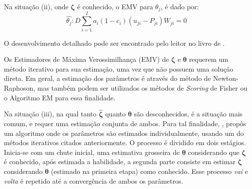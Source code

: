 Na situação (ii), onde $\boldsymbol{\zeta}$ é conhecido, o EMV para $ \theta_j $,  é dado por:\\


\[ \hat{\theta_j} : D\sum_{i=1}^{I}{a_i(1-c_i)(u_{ji}-P_{ji})W_{ji}} = 0  \] 

O desenvolvimento detalhado pode ser encontrado pelo leitor no livro de .

Os Estimadores de Máxima Verossimilhança (EMV) de $ \boldsymbol{\zeta} $ e $ \boldsymbol{\theta} $ requerem um método iterativo para sua estimação, uma vez que não possuem uma solução direta. Em geral, a estimação dos parâmetros é através do método de Newton-Raphoson, mas também podem ser utilizados os métodos de \textit{Scoring} de Fisher ou o Algoritmo EM para essa finalidade.

\begin{comment}
 \citeonline{de2000teoria}. Sendo assim, considerando $\boldsymbol{\hat{\zeta}}^{(t)}_{i}$
uma estimativa de $\boldsymbol{\hat{\zeta}}$ na iteração $t$, o procedimento de
Newton-Raphson é dado por:\\

\noindent $ \boldsymbol{\hat{\zeta}}^{(t+1)}_{i} = \boldsymbol{\hat{\zeta}}^{(t)}_{i} + [\bold{H}(\boldsymbol{\hat{\zeta}}^{(t)})]^{-1}\bold{h}({\boldsymbol{\hat{\zeta}}^{(t)}})
$, onde $\bold{H}$ representa a matriz Hessiana.\\
\end{comment}


Na situação (iii), na qual tanto $ \boldsymbol{\hat{\zeta}} $ quanto $ \boldsymbol{\theta} $ são desconhecidos, é a situação mais comum, e requer uma estimação conjunta de ambos.
Para tal finalidade, , propôs um algoritmo onde os parâmetros são estimados individualmente, usando um do métodos iterativos citados anteriormente.
O processo é dividido em dois estágios. Inicia-se com um chute inicial, uma estimativa grosseira de $ \boldsymbol{\theta} $ considerando que $ \boldsymbol{\zeta} $ é conhecido, após estimada a habilidade, a segunda parte consiste em estimar $ \boldsymbol{\zeta} $ considerando $ \boldsymbol{\theta} $ (estimado na primeira etapa) como conhecido. Esse processo \textit{vai} e \textit{volta} é repetido até a convergência de ambos os parâmetros.



\begin{comment}
Além do método de Estimação de Máxima Verossimilhança (EMV), existem outros métodos de estimação dos parâmetros, que são frequentemente utilizados em contextos de avaliação educacional, estes incluem:
\end{comment}

